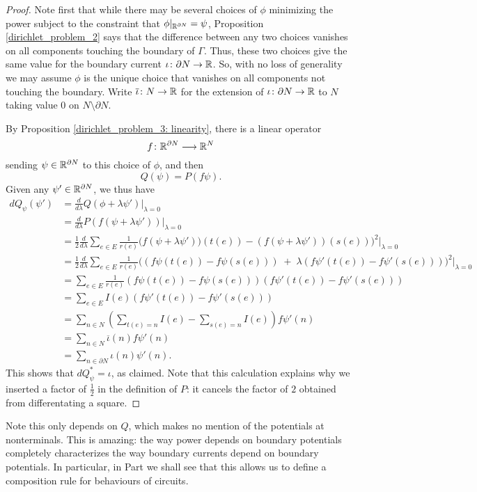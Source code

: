 \begin{proof}
Note first that while there may be several choices of $\phi$ minimizing the power subject to the constraint that $\phi|_{{\mathbb{R}}^{\partial N}} = \psi$, Proposition \ref{dirichlet_problem_2} says that the difference between any two choices vanishes on all components touching the boundary of $\Gamma$.  Thus, these two choices give the same value for the boundary current $\iota{\colon} \partial N \to {\mathbb{R}}$. So, with no loss of generality we may assume $\phi$ is the unique choice that vanishes on all components not touching the boundary. Write $\overline\iota{\colon} N \to {\mathbb{R}}$ for the extension of $\iota{\colon} \partial N \to {\mathbb{R}}$ to $N$ taking value $0$ on $N \setminus \partial N$. 

By Proposition \ref{dirichlet_problem_3: linearity}, there is a linear operator
\[
f{\colon} {\mathbb{R}}^{\partial N} \longrightarrow {\mathbb{R}}^N
\]
sending $\psi \in {\mathbb{R}}^{\partial N}$ to this choice of $\phi$, and then
\[
Q(\psi) = P(f\psi).
\]
Given any $\psi' \in {\mathbb{R}}^{\partial N}$, we thus have
\begin{align*}
dQ_\psi(\psi') &= \frac{d}{d\lambda}Q(\phi +\lambda\psi') \bigg|_{\lambda=0} \\
&= \frac{d}{d\lambda}P(f(\psi+\lambda\psi'))\bigg|_{\lambda=0} \\
&= \frac{1}{2} \frac{d}{d\lambda}\sum_{e \in E} \frac1{r(e)}\bigg(f(\psi+\lambda\psi'))(t(e))-(f(\psi+\lambda\psi'))(s(e))\bigg)^2 \bigg|_{\lambda=0} \\
&= \frac{1}{2} \frac{d}{d\lambda}\sum_{e \in E} \frac1{r(e)}\bigg((f\psi(t(e))-f\psi(s(e))) \;+\;\lambda (f\psi'(t(e))- f\psi'(s(e)))\bigg)^2 \bigg|_{\lambda=0} \\
&= \sum_{e \in E} \frac1{r(e)}(f\psi(t(e))-f\psi(s(e)))(f\psi'(t(e))- f\psi'(s(e))) \\
&= \sum_{e \in E} I(e)(f\psi'(t(e))- f\psi'(s(e))) \\
&= \sum_{n \in N}\left(\sum_{t(e) = n} I(e) - \sum_{s(e) = n} I(e)\right)f\psi'(n) \\
&= \sum_{n \in N}\overline \iota(n) f\psi'(n) \\
&= \sum_{n \in \partial N}\iota(n) \psi'(n).
\end{align*}
This shows that $dQ_\psi^\ast = \iota$, as claimed.  Note that this calculation explains why we inserted a factor of $\frac{1}{2}$ in the definition of $P$: it cancels the factor of $2$ obtained from differentating a square.
 \end{proof}

Note this only depends on $Q$, which makes no mention of the potentials at
nonterminals. This is amazing: the way power depends on boundary potentials
completely characterizes the way boundary currents depend on boundary
potentials. In particular, in Part  we shall see that this
allows us to define a composition rule for behaviours of circuits.

